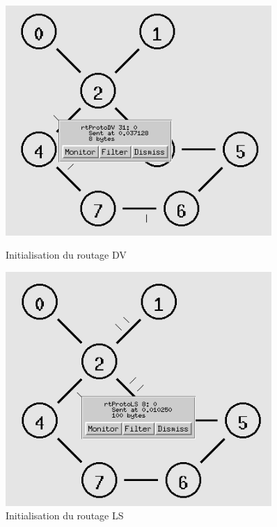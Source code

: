 \documentclass[11pt]{article}
\begin{document}
\begin{figure}[H]
    \begin{minipage}[c]{.5\linewidth}
        \centering
        \includegraphics[width=0.9\textwidth]{assets/tp2/RoutageInitDV.png}
        \caption{Initialisation du routage DV}
        \label{initDV}
    \end{minipage}
    \hfill%
    \begin{minipage}[c]{.5\linewidth}
        \centering
        \includegraphics[width=0.9\textwidth]{assets/tp2/RoutageInitLS.png}
        \caption{Initialisation du routage LS}
        \label{initLS}
    \end{minipage}
\end{figure}
\end{document}
